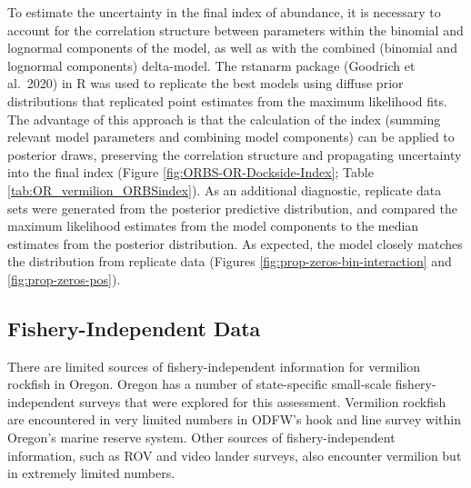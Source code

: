 \documentclass[11pt,
  english,
  a4paper,
]{article}
\begin{document}
To estimate the uncertainty in the final index of abundance, it is necessary to account for the correlation structure between parameters within the binomial and lognormal components of the model, as well as with the combined (binomial and lognormal components) delta-model. The rstanarm package (Goodrich et al.~2020) in R was used to replicate the best models using diffuse prior distributions that replicated point estimates from the maximum likelihood fits. The advantage of this approach is that the calculation of the index (summing relevant model parameters and combining model components) can be applied to posterior draws, preserving the correlation structure and propagating uncertainty into the final index (Figure \ref{fig:ORBS-OR-Dockside-Index}; Table \ref{tab:OR_vermilion_ORBSindex}). As an additional diagnostic, replicate data sets were generated from the posterior predictive distribution, and compared the maximum likelihood estimates from the model components to the median estimates from the posterior distribution. As expected, the model closely matches the distribution from replicate data (Figures \ref{fig:prop-zeros-bin-interaction} and \ref{fig:prop-zeros-pos}).

\leavevmode\tagmcend\tagstructend\par


\hypertarget{fishery-independent-data}{%
\subsection{Fishery-Independent Data}\label{fishery-independent-data}}

\leavevmode\tagmcend\tagstructend


There are limited sources of fishery-independent information for vermilion rockfish in Oregon. Oregon has a number of state-specific small-scale fishery-independent surveys that were explored for this assessment. Vermilion rockfish are encountered in very limited numbers in ODFW's hook and line survey within Oregon's marine reserve system. Other sources of fishery-independent information, such as ROV and video lander surveys, also encounter vermilion but in extremely limited numbers.

\leavevmode\tagmcend\tagstructend\par

\end{document}
